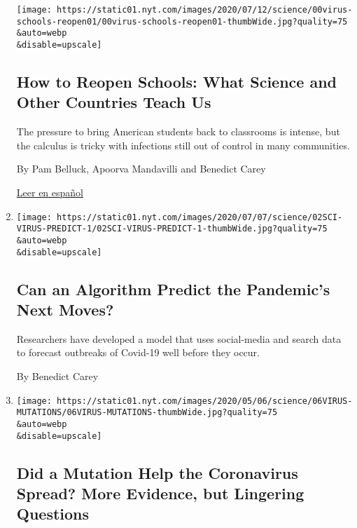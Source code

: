 \begin{enumerate}
  \texttt{[image: https://static01.nyt.com/images/2020/07/12/science/00virus-schools-reopen01/00virus-schools-reopen01-thumbWide.jpg?quality=75\\\&auto=webp\\\&disable=upscale]}

  \hypertarget{how-to-reopen-schools-what-science-and-other-countries-teach-us}{%
  \subsection{How to Reopen Schools: What Science and Other Countries
  Teach
  Us}\label{how-to-reopen-schools-what-science-and-other-countries-teach-us}}

  The pressure to bring American students back to classrooms is intense,
  but the calculus is tricky with infections still out of control in
  many communities.

  By Pam Belluck, Apoorva Mandavilli and Benedict Carey

  \href{https://www.nytimes.com/es/2020/07/27/espanol/ciencia-y-tecnologia/regreso-a-clases-coronavirus.html}{Leer
  en español}
\item
  \href{/2020/07/02/health/santillana-coronavirus-model-forecast.html}{}

  \texttt{[image: https://static01.nyt.com/images/2020/07/07/science/02SCI-VIRUS-PREDICT-1/02SCI-VIRUS-PREDICT-1-thumbWide.jpg?quality=75\\\&auto=webp\\\&disable=upscale]}

  \hypertarget{can-an-algorithm-predict-the-pandemics-next-moves}{%
  \subsection{Can an Algorithm Predict the Pandemic's Next
  Moves?}\label{can-an-algorithm-predict-the-pandemics-next-moves}}

  Researchers have developed a model that uses social-media and search
  data to forecast outbreaks of Covid-19 well before they occur.

  By Benedict Carey
\item
  \href{/2020/07/02/health/coronavirus-korber-mutation.html}{}

  \texttt{[image: https://static01.nyt.com/images/2020/05/06/science/06VIRUS-MUTATIONS/06VIRUS-MUTATIONS-thumbWide.jpg?quality=75\\\&auto=webp\\\&disable=upscale]}

  \hypertarget{did-a-mutation-help-the-coronavirus-spread-more-evidence-but-lingering-questions}{%
  \subsection{Did a Mutation Help the Coronavirus Spread? More Evidence,
  but Lingering
  Questions}\label{did-a-mutation-help-the-coronavirus-spread-more-evidence-but-lingering-questions}}


\end{enumerate}
